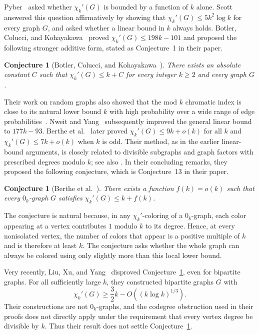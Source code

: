 \documentclass[10pt,a4paper]{amsart}
\newtheorem{conjecture}[theorem]{Conjecture}
\newcommand{\chik}{\chi_k'}
\begin{document}
Pyber~\cite{Pyber1992} asked whether $\chik(G)$ is bounded by a function
of $k$ alone. Scott~\cite{Scott1997} answered this question affirmatively
by showing that $\chik(G)\leq5k^2\log k$ for every graph $G$, and asked
whether a linear bound in $k$ always holds. Botler, Colucci, and
Kohayakawa~\cite{BotlerColucciKohayakawa2023} proved
$\chik(G)\leq198k-101$ and proposed the following stronger additive
form, stated as Conjecture~1 in their paper.

\begin{conjecture}[Botler, Colucci, and Kohayakawa~\cite{BotlerColucciKohayakawa2023}]
\label{conj:additive-constant}
There exists an absolute constant $C$ such that
$\chik(G)\leq k+C$ for every integer $k\geq2$ and every graph $G$.
\end{conjecture}

Their work on random graphs also showed that the mod $k$ chromatic index
is close to its natural lower bound $k$ with high probability over a
wide range of edge probabilities~\cite{BotlerColucciKohayakawaRandom2023}.
Nweit and Yang~\cite{NweitYang2024} subsequently improved the general
linear bound to $177k-93$. Berthe et al.~\cite{BertheEtAl2026} later proved
$\chik(G)\leq9k+o(k)$ for all $k$ and $\chik(G)\leq7k+o(k)$ when $k$ is
odd. Their method, as in the earlier linear-bound arguments, is closely
related to divisible subgraphs and graph factors with prescribed
degrees modulo $k$; see also
\cite{AlonFriedlandKalai1984,Mader1972,Thomassen2014}. In their concluding
remarks, they proposed the following conjecture, which is Conjecture~13
in their paper.

\begin{conjecture}[Berthe et al.~\cite{BertheEtAl2026}]\label{conj:berthe}
There exists a function $f(k)=o(k)$ such that every $0_k$-graph $G$
satisfies $\chik(G)\leq k+f(k)$.
\end{conjecture}

The conjecture is natural because, in any $\chi_k'$-coloring of a
$0_k$-graph, each color appearing at a vertex contributes $1$ modulo
$k$ to its degree. Hence, at every nonisolated vertex, the number of
colors that appear is a positive multiple of $k$ and is therefore at
least $k$. The conjecture asks whether the whole graph can always be
colored using only slightly more than this local lower bound.

Very recently, Liu, Xu, and Yang~\cite{LiuXuYang2026} disproved
Conjecture~\ref{conj:additive-constant}, even for bipartite graphs.
For all sufficiently large $k$, they constructed bipartite graphs $G$
with
\[
\chi_k'(G)\geq \frac32 k-O((k\log k)^{1/3}).
\]
Their constructions are not $0_k$-graphs, and the codegree obstruction
used in their proofs does not directly apply under the requirement that
every vertex degree be divisible by $k$. Thus their result does not
settle Conjecture~\ref{conj:berthe}.
\end{document}
